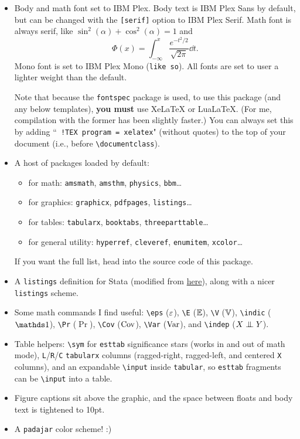 \documentclass[11pt]{padajar-memo}
\newcommand{\ttslash}[1]{\texttt{\textbackslash #1}}
\begin{document}
\begin{itemize}
	\item Body and math font set to IBM Plex. Body text is IBM Plex Sans by default, but can be changed with the \texttt{[serif]} option to IBM Plex Serif. Math font is always serif, like $\sin^2(\alpha) + \cos^2(\alpha) = 1$ and
	\[
	\Phi(x) = \int_{-\infty}^x \frac{e^{-t^2/2}}{\sqrt{2\pi}} \dd{t}.
	\]
	Mono font is set to IBM Plex Mono (\texttt{like so}). All fonts are set to user a lighter weight than the default.

	Note that because the \texttt{fontspec} package is used, to use this package (and any below templates), \textbf{you must} use XeLaTeX or LuaLaTeX. (For me, compilation with the former has been slightly faster.) You can always set this by adding ``\texttt{ !TEX program = xelatex}" (without quotes) to the top of your document (i.e., before \ttslash{documentclass}).
	\item A host of packages loaded by default:
	\begin{itemize}
		\item for math: \texttt{amsmath}, \texttt{amsthm}, \texttt{physics}, \texttt{bbm}\dots
		\item for graphics: \texttt{graphicx}, \texttt{pdfpages}, \texttt{listings}\dots
		\item for tables: \texttt{tabularx}, \texttt{booktabs}, \texttt{threeparttable}\dots
		\item for general utility: \texttt{hyperref}, \texttt{cleveref}, \texttt{enumitem}, \texttt{xcolor}\dots
	\end{itemize}
	If you want the full list, head into the source code of this package.
	\item A \texttt{listings} definition for Stata (modified from \href{https://github.com/satejsoman/stata-lstlisting}{here}), along with a nicer \texttt{listings} scheme.
	\item Some math commands I find useful: \ttslash{eps} ($\varepsilon$), \ttslash{E} ($\mathbb{E}$), \ttslash{V} ($\mathbb{V}$), \ttslash{indic} ($\indic$), \ttslash{Pr} ($\Pr$), \ttslash{Cov} ($\operatorname{Cov}$), \ttslash{Var} ($\operatorname{Var}$), and \ttslash{indep} ($X \mathrel{\perp\mkern-10mu\perp} Y$).
	\item Table helpers: \ttslash{sym} for \texttt{esttab} significance stars (works in and out of math mode), \texttt{L}/\texttt{R}/\texttt{C} \texttt{tabularx} columns (ragged-right, ragged-left, and centered \texttt{X} columns), and an expandable \ttslash{input} inside \texttt{tabular}, so \texttt{esttab} fragments can be \ttslash{input} into a table.
	\item Figure captions sit above the graphic, and the space between floats and body text is tightened to 10pt.
	\item A \texttt{padajar} color scheme! :)
\end{itemize}
\end{document}
